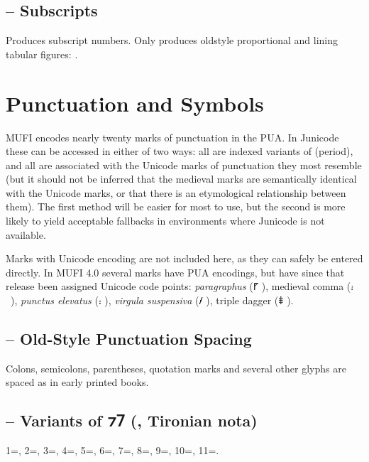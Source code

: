 \subsection{ – Subscripts}
Produces subscript numbers. Only produces oldstyle proportional and lining tabular figures:
.

\section{Punctuation and Symbols}
MUFI encodes nearly twenty marks of punctuation in the PUA. In Junicode these can be accessed in
either of two ways: all are indexed variants of  (period), and all are associated with the Unicode marks of
punctuation they most resemble (but it should not be inferred that the medieval marks are semantically identical with
the Unicode marks, or that there is an etymological relationship between them). The first method will be easier for
most to use, but the second is more likely to yield acceptable fallbacks in environments where Junicode is not
available.

Marks with Unicode encoding are not included here, as they can safely be entered directly. In MUFI 4.0 several marks
have PUA encodings, but have since that release been assigned Unicode code points: \textit{paragraphus} (⹍
), medieval comma (⹌~), \textit{punctus elevatus} (⹎ ), \textit{virgula suspensiva}
(⹊ ), triple dagger (⹋ ).

\subsection{ – Old-Style Punctuation Spacing}
Colons, semicolons, parentheses, quotation marks and several other glyphs are spaced as in early printed books.

\subsection{ – Variants of ⁊⹒
(, Tironian nota)}
1=, 2=, 3=, 4=, 5=,
6=, 7=, 8=, 9=,
10=, 11=.

